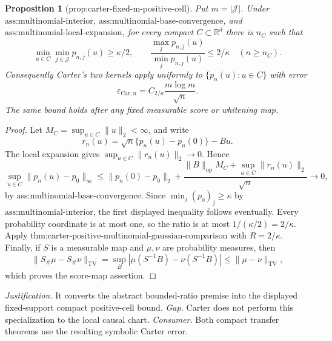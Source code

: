\documentclass{article}
\newtheorem{proposition}{Proposition}
\begin{document}
\begin{proposition}[prop:carter-fixed-m-positive-cell]\label{prop:carter-fixed-m-positive-cell}
Put \(m=|\mathcal J|\). Under \(\text{ass:multinomial-interior}\), \(\text{ass:multinomial-base-convergence}\), and \(\text{ass:multinomial-local-expansion}\), for every compact \(C\subset\mathbb R^d\) there is \(n_C\) such that
\[
 \min_{u\in C}\min_{j\in\mathcal J}p_{n,j}(u)\ge \kappa/2,
 \qquad
 \frac{\max_jp_{n,j}(u)}{\min_jp_{n,j}(u)}\le 2/\kappa
 \quad(n\ge n_C).
\]
Consequently Carter's two kernels apply uniformly to \(\{p_n(u):u\in C\}\) with error
\[
 \varepsilon_{\mathrm{Car},n}=C_{2/\kappa}\frac{m\log m}{\sqrt n}.
\]
The same bound holds after any fixed measurable score or whitening map.
\end{proposition}
\begin{proof}
Let \(M_C=\sup_{u\in C}\|u\|_2<\infty\), and write
\[
 r_n(u)=\sqrt n\{p_n(u)-p_n(0)\}-Bu.
\]
The local expansion gives \(\sup_{u\in C}\|r_n(u)\|_2\to0\). Hence
\[
 \sup_{u\in C}\|p_n(u)-p_0\|_\infty
 \le \|p_n(0)-p_0\|_2+
 \frac{\|B\|_{\mathrm{op}}M_C+\sup_{u\in C}\|r_n(u)\|_2}{\sqrt n}\longrightarrow0,
\]
by \(\text{ass:multinomial-base-convergence}\). Since \(\min_j(p_0)_j\ge\kappa\) by \(\text{ass:multinomial-interior}\), the first displayed inequality follows eventually. Every probability coordinate is at most one, so the ratio is at most \(1/(\kappa/2)=2/\kappa\). Apply \(\text{thm:carter-positive-multinomial-gaussian-comparison}\) with \(R=2/\kappa\). Finally, if \(S\) is a measurable map and \(\mu,\nu\) are probability measures, then
\[
 \|S_\#\mu-S_\#\nu\|_{\mathrm{TV}}
 =\sup_B|\mu(S^{-1}B)-\nu(S^{-1}B)|
 \le \|\mu-\nu\|_{\mathrm{TV}},
\]
which proves the score-map assertion.
\end{proof}
\par\smallskip\noindent \textit{Justification.} It converts the abstract bounded-ratio premise into the displayed fixed-support compact positive-cell bound. \textit{Gap.} Carter does not perform this specialization to the local causal chart. \textit{Consumer.} Both compact transfer theorems use the resulting symbolic Carter error.
\end{document}
